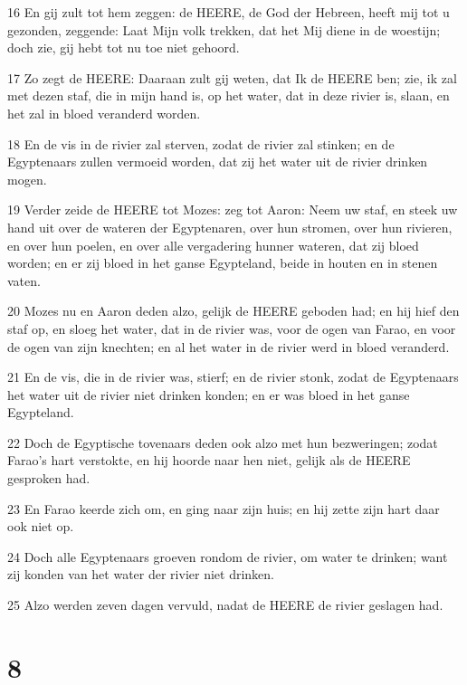 \par 16 En gij zult tot hem zeggen: de HEERE, de God der Hebreen, heeft mij tot u gezonden, zeggende: Laat Mijn volk trekken, dat het Mij diene in de woestijn; doch zie, gij hebt tot nu toe niet gehoord.
\par 17 Zo zegt de HEERE: Daaraan zult gij weten, dat Ik de HEERE ben; zie, ik zal met dezen staf, die in mijn hand is, op het water, dat in deze rivier is, slaan, en het zal in bloed veranderd worden.
\par 18 En de vis in de rivier zal sterven, zodat de rivier zal stinken; en de Egyptenaars zullen vermoeid worden, dat zij het water uit de rivier drinken mogen.
\par 19 Verder zeide de HEERE tot Mozes: zeg tot Aaron: Neem uw staf, en steek uw hand uit over de wateren der Egyptenaren, over hun stromen, over hun rivieren, en over hun poelen, en over alle vergadering hunner wateren, dat zij bloed worden; en er zij bloed in het ganse Egypteland, beide in houten en in stenen vaten.
\par 20 Mozes nu en Aaron deden alzo, gelijk de HEERE geboden had; en hij hief den staf op, en sloeg het water, dat in de rivier was, voor de ogen van Farao, en voor de ogen van zijn knechten; en al het water in de rivier werd in bloed veranderd.
\par 21 En de vis, die in de rivier was, stierf; en de rivier stonk, zodat de Egyptenaars het water uit de rivier niet drinken konden; en er was bloed in het ganse Egypteland.
\par 22 Doch de Egyptische tovenaars deden ook alzo met hun bezweringen; zodat Farao's hart verstokte, en hij hoorde naar hen niet, gelijk als de HEERE gesproken had.
\par 23 En Farao keerde zich om, en ging naar zijn huis; en hij zette zijn hart daar ook niet op.
\par 24 Doch alle Egyptenaars groeven rondom de rivier, om water te drinken; want zij konden van het water der rivier niet drinken.
\par 25 Alzo werden zeven dagen vervuld, nadat de HEERE de rivier geslagen had.

\chapter{8}

